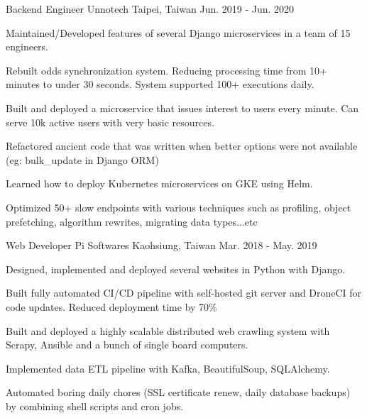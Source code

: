 \begin{cventries}
  \cventry
    {Backend Engineer} %
    {Unnotech} %
    {Taipei, Taiwan} %
    {Jun. 2019 - Jun. 2020} %
    {
      \begin{cvitems} %
        \item {Maintained/Developed features of several Django microservices in a team of 15 engineers. }
        \item {Rebuilt odds synchronization system. Reducing processing time from 10+ minutes to under 30 seconds. System supported 100+ executions daily. }
        \item {Built and deployed a microservice that issues interest to users every minute. Can serve 10k active users with very basic resources. }
        \item {Refactored ancient code that was written when better options were not available (eg: bulk\_update in Django ORM)}
        \item {Learned how to deploy Kubernetes microservices on GKE using Helm. }
        \item {Optimized 50+ slow endpoints with various techniques such as profiling, object prefetching, algorithm rewrites, migrating data types...etc }
      \end{cvitems}
    }

  \cventry
    {Web Developer} %
    {Pi Softwares} %
    {Kaohsiung, Taiwan} %
    {Mar. 2018 - May. 2019} %
    {
      \begin{cvitems} %
        \item {Designed, implemented and deployed several websites in Python with Django.}
        \item {Built fully automated CI/CD pipeline with self-hosted git server and DroneCI for code updates. Reduced deployment time by 70\% }
        \item {Built and deployed a highly scalable distributed web crawling system with Scrapy, Ansible and a bunch of single board computers.}
        \item {Implemented data ETL pipeline with Kafka, BeautifulSoup, SQLAlchemy.}
        \item {Automated boring daily chores (SSL certificate renew, daily database backups) by combining shell scripts and cron jobs. }
      \end{cvitems}
    }

\end{cventries}
